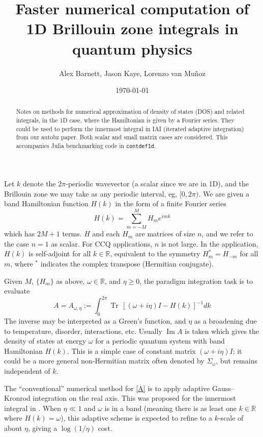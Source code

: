\documentclass[11pt]{article}
\newcommand{\be}{\begin{equation}}
\newcommand{\ee}{\end{equation}}
\newcommand{\R}{\mathbb{R}}
\DeclareMathOperator{\im}{Im}
\DeclareMathOperator{\tr}{Tr}
\newcommand{\om}{\omega}
\begin{document}
\title{Faster numerical computation of 1D Brillouin zone integrals in quantum physics}
\author{Alex Barnett, Jason Kaye, Lorenzo van Mu\~noz}
\date{\today}
\maketitle
\begin{abstract}
  Notes on methods for numerical approximation of density of states
  (DOS) and related integrals, in the 1D case, where the Hamiltonian
  is given by a Fourier series. They could be used
  to perform the innermost integral in IAI (iterated adaptive integration)
  from our autobz paper.
  Both scalar and small matrix cases are considered.
  This accompanies Julia benchmarking code in \texttt{contdef1d}.
\end{abstract}

Let $k$ denote the $2\pi$-periodic wavevector (a scalar since we are in 1D), and
the Brillouin zone we may take as any periodic interval, eg, $[0,2\pi)$.
We are given a band Hamiltonian function $H(k)$ in the form of a finite Fourier
series
\be
H(k) = \sum_{m=-M}^M H_m e^{imk}
\label{Hk}
\ee
which has $2M+1$ terms. $H$ and each $H_m$ are matrices of size $n$,
and we refer to the case $n=1$ as scalar.
For CCQ applications, $n$ is not large.
In the application, $H(k)$ is self-adjoint for all $k\in\R$,
equivalent to the symmetry $H_m^* = H_{-m}$ for all $m$, where
$^*$ indicates the complex transpose (Hermitian conjugate).

Given $M$, $\{H_m\}$ as above, $\om\in \R$, and $\eta\ge0$,
the paradigm integration task is to evaluate
\be
A = A_{\om,\eta} := \int_{0}^{2\pi} \tr\, [(\om +i\eta)I - H(k)]^{-1} dk
\label{A}
\ee
The inverse may be interpreted as a Green's function, and $\eta$
as a broadening due to temperature, disorder, interactions, etc.
Usually $\im A$ is taken which gives the density of states at energy $\om$
for a periodic quantum system with band Hamiltonian $H(k)$.
This is a simple case of constant matrix $(\om+i\eta)I$; it could
be a more general non-Hermitian matrix often denoted by
$\Sigma_\om$, but remains independent of $k$.

The ``conventional'' numerical method for \eqref{A} is
to apply adaptive Gauss--Kronrod integration on the real axis.
This was proposed for the innermost integral in \cite{autobz}.
When $\eta\ll1$ and $\om$ is in a band (meaning there is as least one
$k\in\R$ where $H(k)=\om$), this adaptive scheme is expected
to refine to a $k$-scale of about $\eta$, giving a $\log(1/\eta)$ cost.
\end{document}
